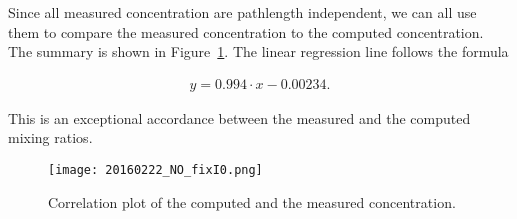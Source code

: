 Since all measured concentration are pathlength independent, we can
all use them to compare the measured  concentration to the
computed  concentration. The summary is shown in
Figure~\ref{fig:no-calib}. The linear regression line follows the formula

\begin{align*}
  y = 0.994 \cdot x -0.00234.
\end{align*}

This is an exceptional accordance between the measured and the
computed mixing ratios.

\begin{figure}[htbp]
  \centering
  \texttt{[image: 20160222\_NO\_fixI0.png]}
  \caption{Correlation plot of the computed and the measured 
    concentration.}
  \label{fig:no-calib}
\end{figure}

